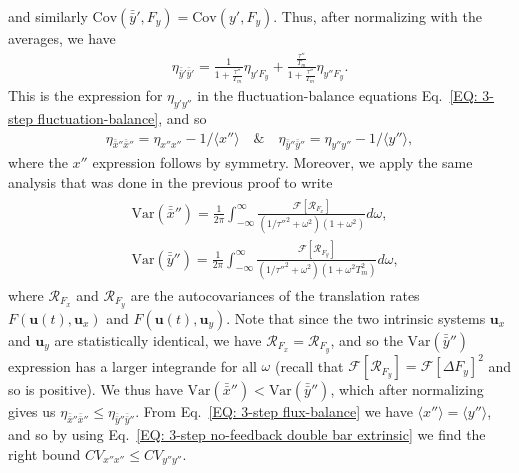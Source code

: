 \documentclass[%
 reprint,prx,
superscriptaddress,
%
%
%
%
%
%
%
%
%
 amsmath,amssymb,
 aps,
%
%
%
%
%
%
]{revtex4-2}
\begin{document}
{\begin{widetext}
\end{widetext}
and similarly $ \text{Cov}( \bar{\bar{y}}', F_{y} ) = \text{Cov}( y', F_{y} )$. Thus, after normalizing with the averages, we have
\begin{align*}
\eta_{\bar{\bar{y}}'\bar{\bar{y}}'} =   \frac{1}{1 + \frac{\tau''}{T_{m}}}\eta_{y'F_{y}} + \frac{\frac{\tau''}{T_{m}}}{1 + \frac{\tau''}{T_{m}}}\eta_{y''F_{y}} .
\end{align*}
This is the expression for $\eta_{y'y''}$ in the fluctuation-balance equations Eq.~\eqref{EQ: 3-step fluctuation-balance}, and so
\begin{align}
    \eta_{\bar{\bar{x}}''\bar{\bar{x}}''}  = \eta_{x''x''} - 1/\langle x''\rangle \quad \text{\&} \quad \eta_{\bar{\bar{y}}''\bar{\bar{y}}''}  = \eta_{y''y''} - 1/\langle y'' \rangle ,
\label{EQ: 3-step no-feedback double bar extrinsic}
\end{align}
where the $x''$ expression follows by symmetry.
Moreover, we apply the same analysis that was done in the previous proof to write 
\begin{align}
\begin{split}
 &\text{Var}(\bar{\bar{x}}'') = \frac{1}{2\pi}\int_{-\infty}^{\infty}\frac{\mathcal{F}[\mathcal{R}_{F_{x}}]}{(1/\tau''^{2} + \omega^{2})(1 + \omega^{2})}d\omega, \\ &\text{Var}(\bar{\bar{y}}'') = \frac{1}{2\pi}\int_{-\infty}^{\infty}\frac{\mathcal{F}[\mathcal{R}_{F_{y}}]}{(1/\tau''^{2} + \omega^{2})(1 + \omega^{2}T_{m}^{2})}d\omega,
\end{split}
\label{EQ: no-feedback 3-step double bar variances from Fourier}
\end{align}
where $\mathcal{R}_{F_{x}}$ and $\mathcal{R}_{F_{y}}$ are the autocovariances of the translation rates $F(\mathbf{u}(t),\mathbf{u}_{x})$ and $F(\mathbf{u}(t),\mathbf{u}_{y})$. Note that since the two intrinsic systems $\mathbf{u}_{x}$ and $\mathbf{u}_{y}$ are statistically identical, we have $\mathcal{R}_{F_{x}} = \mathcal{R}_{F_{y}}$, and so the $\text{Var}( \bar{\bar{y}}'')$ expression 
has a larger integrande for all $\omega$ (recall that $\mathcal{F}[\mathcal{R}_{F_{y}}] = \mathcal{F}[\Delta F_{y}]^{2}$ and so is positive). We thus have 
$\text{Var}( \bar{\bar{x}}'') < \text{Var}( \bar{\bar{y}}'')$, which after normalizing gives us $\eta_{\bar{\bar{x}}''\bar{\bar{x}}''}  \leq \eta_{\bar{\bar{y}}''\bar{\bar{y}}''}$.
From Eq.~\eqref{EQ: 3-step flux-balance} we have $\langle x'' \rangle = \langle y'' \rangle$, and so by using 
Eq.~\eqref{EQ: 3-step no-feedback double bar extrinsic} we find the right bound $CV_{x''x''} \leq CV_{y''y''}$.\\

}
\end{document}
